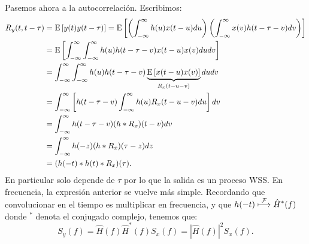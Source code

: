 Pasemos ahora a la autocorrelación. Escribimos:
\begin{align*}
    R_y(t,t-\tau) &= \mathrm{E}\left[y(t)y(t-\tau)\right] = \mathrm{E}\left[\left(\int_{-\infty}^\infty h(u)x(t-u)du\right)\left(\int_{-\infty}^\infty x(v)h(t-\tau-v)dv\right)\right]\\
    &=\mathrm{E}\left[\int_{-\infty}^\infty\int_{-\infty}^\infty h(u)h(t-\tau-v)x(t-u)x(v)dudv\right] \\
    &=\int_{-\infty}^\infty\int_{-\infty}^\infty h(u)h(t-\tau-v)\underbrace{\mathrm{E}\left[x(t-u)x(v)\right]}_{R_x(t-u-v)} dudv \\
    &=\int_{-\infty}^\infty\left[h(t-\tau-v) \int_{-\infty}^\infty h(u) R_x(t-u-v)du\right] dv \\
    &=\int_{-\infty}^\infty h(t-\tau-v) (h * R_x)(t-v) dv \\
    &=\int_{-\infty}^\infty h(-z) (h * R_x)(\tau-z) dz \\
    &= (h(-t)*h(t)*R_x)(\tau).
\end{align*}
En particular solo depende de $\tau$ por lo que la salida es un proceso WSS. En frecuencia, la expresión anterior se vuelve más simple. Recordando que convolucionar en el tiempo es multiplicar en frecuencia, y que $h(-t)\;\displaystyle{\mathop{\longmapsto}^{\mathcal{F}}}\; \hat{H}^*(f)$ donde $^*$ denota el conjugado complejo, tenemos que:
\begin{equation}\label{eq:espectro filtrado}
    S_y(f) = \hat{H}(f)\hat{H}^*(f) S_x(f) = |\hat{H}(f)|^2 S_x(f).
\end{equation}

